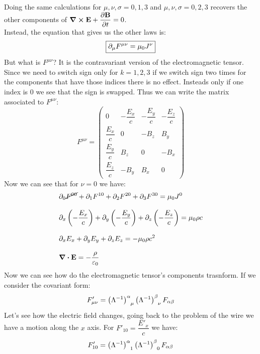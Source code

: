 Doing the same calculations for $\mu,\nu,\sigma = 0,1,3$ and $\mu,\nu,\sigma = 0,2,3$ recovers the other components of $\curl{\vec{E}} + \pdv{\vec{B}}{t} = 0$.\\
Instead, the equation that gives us the other laws is:
\begin{equation}
  \boxed{\partial_{\mu}F^{\mu\nu} = \mu_0 J^{\nu}}
\end{equation}
But what is $F^{\mu\nu}$? It is the contravariant version of the electromagnetic tensor. Since we need to switch sign only for $k=1,2,3$ if we switch sign two times for the components that have those indices there is no effect. Insteads only if one index is $0$ we see that the sign is swapped. Thus we can write the matrix associated to $F^{\mu\nu}$:
\begin{equation}
  F^{\mu\nu} =
  \begin{pmatrix}
  0 & -\dfrac{E_x}{c} & -\dfrac{E_y}{c} & -\dfrac{E_z}{c} \\[8pt]
  \dfrac{E_x}{c} & 0 & -B_z & B_y \\[8pt]
  \dfrac{E_y}{c} & B_z & 0 & -B_x \\[8pt]
  \dfrac{E_z}{c} & -B_y & B_x & 0
  \end{pmatrix}
\end{equation}
Now we can see that for $\nu = 0$ we have:
\begin{equation}
  \begin{split}
    &\partial_{0}\cancel{F^{00}} + \partial_{1}F^{10} + \partial_{2}F^{20} + \partial_{3}F^{30} = \mu_0 J^{0} \\[8pt]
    &\partial_{x}\left(-\dfrac{E_x}{c}\right) + \partial_{y}\left(-\dfrac{E_y}{c}\right) + \partial_{z}\left(-\dfrac{E_z}{c}\right) = \mu_0 \rho c \\[8pt]
    &\partial_{x}E_x + \partial_{y}E_y + \partial_{z}E_z = -\mu_0 \rho c^2 \\[8pt]
    &\div{\vb{E}} = -\dfrac{\rho}{\varepsilon_0}
  \end{split}
\end{equation}
Now we can see how do the electromagnetic tensor's components trasnform. If we consider the covariant form:
\begin{equation}
  F'_{\mu\nu} = \tensor{\brackets{\lm^{-1}}}{^{\alpha}_{\mu}}\tensor{\brackets{\lm^{-1}}}{^{\beta}_{\nu}}F_{\alpha\beta}
\end{equation}
Let's see how the electric field changes, going back to the problem of the wire we have a motion along the $x$ axis. For $F'_{10} = \dfrac{E'_x}{c}$ we have:
\begin{equation}
  F'_{10} = \tensor{\brackets{\lm^{-1}}}{^{\alpha}_{1}}\tensor{\brackets{\lm^{-1}}}{^{\beta}_{0}}F_{\alpha\beta}
\end{equation}

